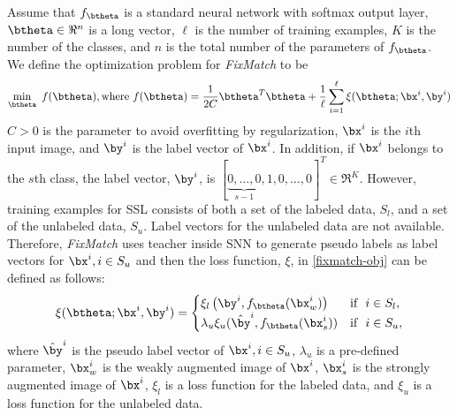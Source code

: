 \documentclass{article}
\begin{document}
\par Assume that $f_{\btheta}$ is a standard neural network with softmax output layer,
$\btheta \in \Re^n$ is a long vector, $\ell$ is the number of training examples, $K$ is the number of the classes, and $n$ is the total number of the parameters of $f_{\btheta}$.
We define the optimization problem for {\sl FixMatch} to be
\begin{equation}
\label{fixmatch-obj}
    \min_{\btheta}\ f(\btheta), \text{where}\ f(\btheta) = 
    \frac{1}{2C} \btheta^T \btheta + 
    \frac{1}{\ell} \sum_{i=1}^\ell \xi(\btheta;\bx^i,\by^i)
\end{equation}
$C > 0$ is the parameter to avoid overfitting by regularization, $\bx^i$ is the $i$th input image, and $\by^i$ is the label vector of $\bx^i$.
In addition, if $\bx^i$ belongs to the $s$th class, the label vector, $\by^i$, is $[\underbrace{0, \ldots, 0}_{s-1}, 1, 0, \ldots, 0]^T \in \Re^K$.
However, training examples for SSL consists of both a set of the labeled data, $S_l$, and a set of the unlabeled data, $S_u$.
Label vectors for the unlabeled data are not available.
Therefore, {\sl FixMatch} uses teacher inside SNN to generate pseudo labels as label vectors for $\bx^i, i \in S_u$  
and then the loss function, $\xi$, in \eqref{fixmatch-obj} can be defined as follows:
\begin{equation}
\label{fixmatch-loss}
    \xi(\btheta;\bx^i,\by^i) = 
    \begin{cases}
        \xi_l\left(\by^i, f_{\btheta}(\bx^i_{w})\right) & \text{if}\ \ i \in S_{l},\\
        \lambda_u \xi_u(\hat{\by}^i, f_{\btheta}(\bx^i_{s})) & \text{if}\ \ i \in S_{u},
    \end{cases}
\end{equation}
where $\hat{\by}^i$ is the pseudo label vector of $\bx^i, i \in S_u$, $\lambda_u$ is a pre-defined parameter, $\bx^i_w$ is the weakly augmented image of $\bx^i$, $\bx^i_s$ is the strongly augmented image of $\bx^i$,
$\xi_l$ is a loss function for the labeled data, and $\xi_u$ is a loss function for the unlabeled data.
\end{document}
